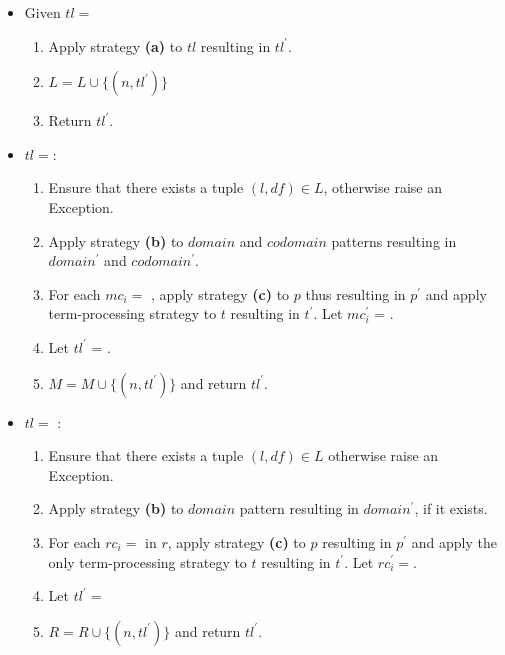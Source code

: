 \begin{itemize}
\item
Given $tl=$\space \TlDefineLanguage
	\begin{enumerate}
		\item Apply strategy \textbf{(a)} to $tl$ resulting in $tl^{\prime}$.
		\item $L = L \cup \{ (n, tl^{\prime}) \}$
		\item Return $tl^{\prime}$.
	\end{enumerate}

\item $tl=$\space \TlDefineMetafunction:
	\begin{enumerate}
	\item Ensure that there exists a tuple $(l, df) \in L$, otherwise raise an Exception.
	\item Apply strategy \textbf{(b)} to $domain$ and $codomain$ patterns resulting in $domain^\prime$ and $codomain^\prime$.
	\item For each $mc_i=$ \MetafunctionCase, apply strategy \textbf{(c)} to $p$ thus resulting in $p^{\prime}$ and apply term-processing strategy to $t$ resulting in $t^{\prime}$. Let $mc_i^{\prime}$ = \MetafunctionCase[$p^{\prime}$][$t^{\prime}$].
	\item Let $tl^\prime$  = .
	\item $M = M \cup \{ (n, tl^\prime)\}$ and return $tl^\prime$.
	\end{enumerate}

\item $tl=$ \TlDefineReductionRelation:
\begin{enumerate}
\item Ensure that there exists a tuple $(l, df) \in L$ otherwise raise an Exception.
\item Apply strategy \textbf{(b)} to $domain$ pattern resulting in $domain^\prime$, if it exists.
\item For each $rc_i=$ \ReductionCase \space in $r$, apply strategy \textbf{(c)} to $p$ resulting in $p^{\prime}$ and apply the only term-processing strategy to $t$ resulting in $t^\prime$. Let $rc_i^\prime=$\space \ReductionCase[$p^{\prime}$][$t^{\prime}$][$n$][false].
\item Let $tl^\prime=$\space {}
\item $R = R \cup \{ (n, tl^\prime) \}$ and return $tl^\prime$.


\end{enumerate}
\end{itemize}
